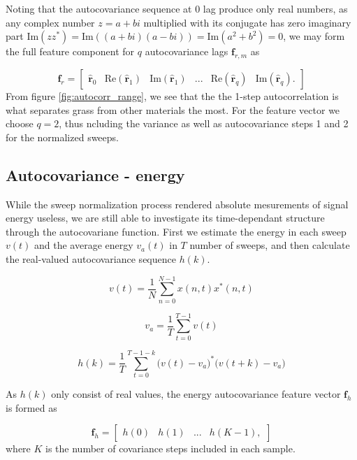 Noting that the autocovariance sequence at 0 lag produce only real numbers, as any complex number $z = a + bi$ multiplied with its conjugate has zero imaginary part $\text{Im}(zz^*) = \text{Im}((a + bi)(a - bi)) = \text{Im}(a^2 + b^2) = 0$, we may form the full feature component for $q$ autocovariance lags $\mathbf{f}_{r,m}$ as

\begin{equation}
	\mathbf{f}_{r} = 
	\begin{bmatrix}
		\hat{\mathbf{r}}_{0}  & \text{Re}(\hat{\mathbf{r}}_{1} ) & \text{Im}(\hat{\mathbf{r}}_{1} ) & ... & \text{Re}(\hat{\mathbf{r}}_{q} ) & \text{Im}(\hat{\mathbf{r}}_{q} ).
	\end{bmatrix}
\end{equation}
From figure \ref{fig:autocorr_range}, we see that the the 1-step autocorrelation is what separates grass from other materials the most. For the feature vector we choose $q=2$, thus ncluding the variance as well as autocovariance steps 1 and 2 for the normalized sweeps.


\subsection{Autocovariance - energy}

While the sweep normalization process rendered absolute mesurements of signal energy useless, we are still able to investigate its time-dependant structure through the autocovariane function. First we estimate the energy in each sweep $v(t)$ and the average energy $v_a(t)$ in $T$ number of sweeps, and then calculate the real-valued autocovariance sequence $h(k)$. 

\begin{equation}
	v(t) = \frac{1}{N}\sum_{n=0}^{N-1}x(n,t)x^*(n,t)
\end{equation}

\begin{equation} 
	v_a = \frac{1}{T}\sum_{t=0}^{T-1}v(t)
\end{equation}

\begin{equation}
	h(k) = \frac{1}{T}\sum_{t=0}^{T-1-k}\big(v(t) - v_a\big)^*\big(v(t+k) - v_a\big)
\end{equation}

As $h(k)$ only consist of real values, the energy autocovariance feature vector $\mathbf{f}_{h}$ is formed as

\begin{equation}
	\mathbf{f}_{h} = 
	\begin{bmatrix}
		h(0) & h(1) & ... & h(K-1),
	\end{bmatrix}
\end{equation}
where $K$ is the number of covariance steps included in each sample. 

